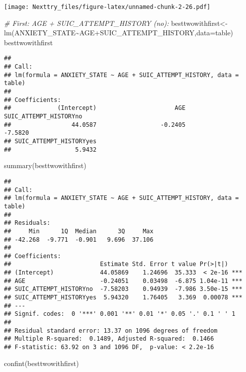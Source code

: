 \documentclass[
]{book}
\newenvironment{Shaded}{\begin{snugshade}}{\end{snugshade}}
\newcommand{\AttributeTok}[1]{\textcolor[rgb]{0.77,0.63,0.00}{#1}}
\newcommand{\CommentTok}[1]{\textcolor[rgb]{0.56,0.35,0.01}{\textit{#1}}}
\newcommand{\FunctionTok}[1]{\textcolor[rgb]{0.00,0.00,0.00}{#1}}
\newcommand{\NormalTok}[1]{#1}
\newcommand{\OtherTok}[1]{\textcolor[rgb]{0.56,0.35,0.01}{#1}}
\newcommand{\SpecialCharTok}[1]{\textcolor[rgb]{0.00,0.00,0.00}{#1}}
\begin{document}
\texttt{[image: Nexttry\_files/figure-latex/unnamed-chunk-2-26.pdf]}

\begin{Shaded}
\begin{Highlighting}[]
\CommentTok{\# First: AGE + SUIC\_ATTEMPT\_HISTORY (no):}
\NormalTok{besttwowithfirst}\OtherTok{\textless{}{-}}\FunctionTok{lm}\NormalTok{(ANXIETY\_STATE}\SpecialCharTok{\textasciitilde{}}\NormalTok{AGE}\SpecialCharTok{+}\NormalTok{SUIC\_ATTEMPT\_HISTORY,}\AttributeTok{data=}\NormalTok{table)}
\NormalTok{besttwowithfirst}
\end{Highlighting}
\end{Shaded}

\begin{verbatim}
## 
## Call:
## lm(formula = ANXIETY_STATE ~ AGE + SUIC_ATTEMPT_HISTORY, data = table)
## 
## Coefficients:
##             (Intercept)                      AGE   SUIC_ATTEMPT_HISTORYno  
##                 44.0587                  -0.2405                  -7.5820  
## SUIC_ATTEMPT_HISTORYyes  
##                  5.9432
\end{verbatim}

\begin{Shaded}
\begin{Highlighting}[]
\FunctionTok{summary}\NormalTok{(besttwowithfirst)}
\end{Highlighting}
\end{Shaded}

\begin{verbatim}
## 
## Call:
## lm(formula = ANXIETY_STATE ~ AGE + SUIC_ATTEMPT_HISTORY, data = table)
## 
## Residuals:
##     Min      1Q  Median      3Q     Max 
## -42.268  -9.771  -0.901   9.696  37.106 
## 
## Coefficients:
##                         Estimate Std. Error t value Pr(>|t|)    
## (Intercept)             44.05869    1.24696  35.333  < 2e-16 ***
## AGE                     -0.24051    0.03498  -6.875 1.04e-11 ***
## SUIC_ATTEMPT_HISTORYno  -7.58203    0.94939  -7.986 3.50e-15 ***
## SUIC_ATTEMPT_HISTORYyes  5.94320    1.76405   3.369  0.00078 ***
## ---
## Signif. codes:  0 '***' 0.001 '**' 0.01 '*' 0.05 '.' 0.1 ' ' 1
## 
## Residual standard error: 13.37 on 1096 degrees of freedom
## Multiple R-squared:  0.1489, Adjusted R-squared:  0.1466 
## F-statistic: 63.92 on 3 and 1096 DF,  p-value: < 2.2e-16
\end{verbatim}

\begin{Shaded}
\begin{Highlighting}[]
\FunctionTok{confint}\NormalTok{(besttwowithfirst)}
\end{Highlighting}
\end{Shaded}
\end{document}
